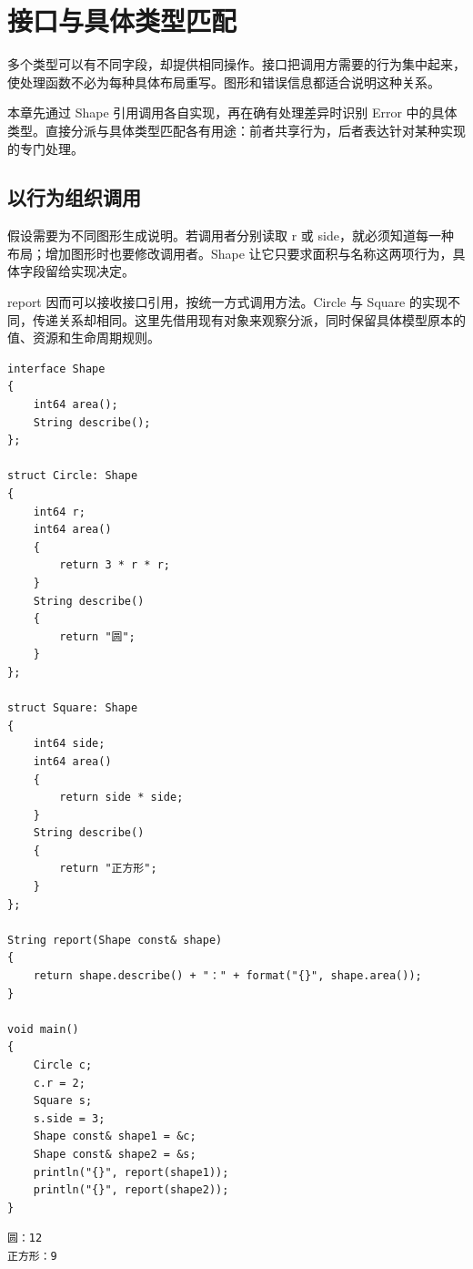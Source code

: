 \chapter{接口与具体类型匹配}
\label{ch:13}

多个类型可以有不同字段，却提供相同操作。接口把调用方需要的行为集中起来，使处理函数不必为每种具体布局重写。图形和错误信息都适合说明这种关系。

本章先通过 Shape 引用调用各自实现，再在确有处理差异时识别 Error 中的具体类型。直接分派与具体类型匹配各有用途：前者共享行为，后者表达针对某种实现的专门处理。

\section{以行为组织调用}

假设需要为不同图形生成说明。若调用者分别读取 r 或 side，就必须知道每一种布局；增加图形时也要修改调用者。Shape 让它只要求面积与名称这两项行为，具体字段留给实现决定。

report 因而可以接收接口引用，按统一方式调用方法。Circle 与 Square 的实现不同，传递关系却相同。这里先借用现有对象来观察分派，同时保留具体模型原本的值、资源和生命周期规则。

\par
\medskip
\begin{lstlisting}[style=chali]
interface Shape
{
    int64 area();
    String describe();
};

struct Circle: Shape
{
    int64 r;
    int64 area()
    {
        return 3 * r * r;
    }
    String describe()
    {
        return "圆";
    }
};

struct Square: Shape
{
    int64 side;
    int64 area()
    {
        return side * side;
    }
    String describe()
    {
        return "正方形";
    }
};

String report(Shape const& shape)
{
    return shape.describe() + "：" + format("{}", shape.area());
}

void main()
{
    Circle c;
    c.r = 2;
    Square s;
    s.side = 3;
    Shape const& shape1 = &c;
    Shape const& shape2 = &s;
    println("{}", report(shape1));
    println("{}", report(shape2));
}
\end{lstlisting}
\par
\medskip

\par
\medskip
\begin{lstlisting}[style=out]
圆：12
正方形：9
\end{lstlisting}
\par
\medskip

